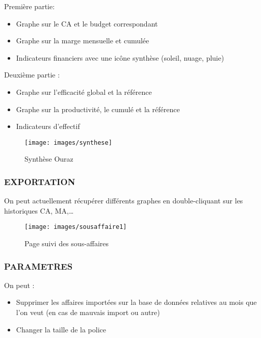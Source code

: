 Première partie: 
\begin{itemize}
\item Graphe sur le CA et le budget correspondant
\item Graphe sur la marge mensuelle et cumulée
\item Indicateurs financiers avec une icône synthèse (soleil, nuage, pluie)
\end{itemize}

Deuxième partie :
\begin{itemize}
\item Graphe sur l’efficacité global et la référence
\item Graphe sur la productivité, le cumulé et la référence
\item Indicateurs d’effectif\\
\end{itemize}

\begin{figure}[!h]
\center
\texttt{[image: images/synthese]}
\caption{Synthèse Ouraz }
\end{figure}


\subsubsection{EXPORTATION}
On peut actuellement récupérer différents graphes en double-cliquant sur les historiques CA, MA,…\\

\begin{figure}[!h]
\center
\texttt{[image: images/sousaffaire1]}
\caption{Page suivi des sous-affaires}
\end{figure}

\subsubsection{PARAMETRES}
On peut :
\begin{itemize}
\item Supprimer les affaires importées sur la base de données relatives au mois que l’on veut (en cas de mauvais import ou autre)
\item Changer la taille de la police\\
\end{itemize}


